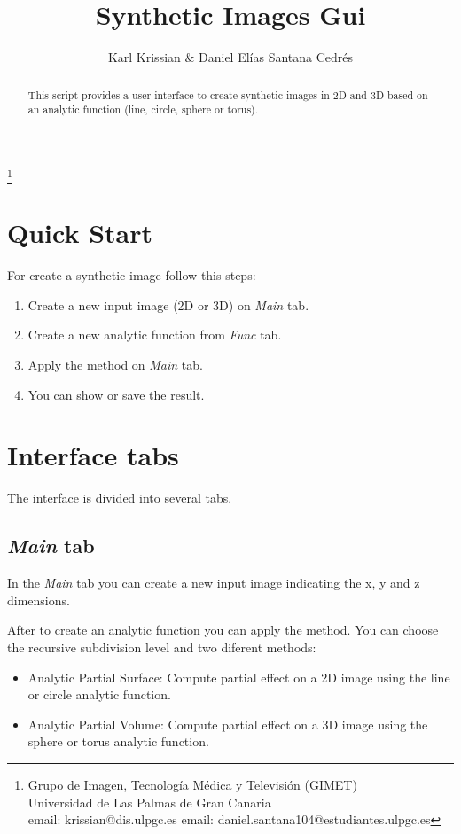 \documentclass{article}
\begin{document}
\title{Synthetic Images Gui}
\author{Karl Krissian \& Daniel El\'ias Santana Cedr\'es}
\thanks{
Grupo de Imagen, Tecnolog\'ia M\'edica y Televisi\'on (GIMET)\\
Universidad de Las Palmas de Gran Canaria\\
email: krissian@dis.ulpgc.es
email: daniel.santana104@estudiantes.ulpgc.es
}


\maketitle

\begin{abstract}
This script provides a user interface to create synthetic images in 2D and 3D based on an analytic function (line, circle, sphere or torus).
\end{abstract}


\section{Quick Start}

For create a synthetic image follow this steps:
\begin{enumerate}
  \item Create a new input image (2D or 3D) on \emph{Main} tab.
  \item Create a new analytic function from \emph{Func} tab.
  \item Apply the method on \emph{Main} tab.
  \item You can show or save the result.
\end{enumerate}

\section{Interface tabs}

The interface is divided into several tabs.

\subsection{\emph{Main} tab}
In the \emph{Main} tab you can create a new input image indicating the x, y and z dimensions.

After to create an analytic function you can apply the method. You can choose the recursive subdivision level and two diferent methods:
\begin{itemize}
	\item Analytic Partial Surface: Compute partial effect on a 2D image using the line or circle analytic function.
	\item Analytic Partial Volume: Compute partial effect on a 3D image using the sphere or torus analytic function.
\end{itemize}
\end{document}
